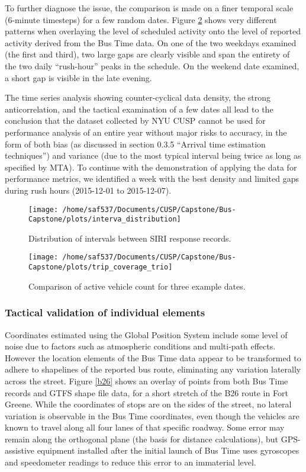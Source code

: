 \documentclass[12pt]{report}
\begin{document}
To further diagnose the issue, the comparison is made on a finer temporal scale (6-minute timesteps) for a few random dates.  Figure \ref{trio} shows very different patterns when overlaying the level of scheduled activity onto the level of reported activity derived from the Bus Time data.  On one of the two weekdays examined  (the first and third), two large gaps are clearly visible and span the entirety of the two daily “rush-hour” peaks in the schedule.  On the weekend date examined, a short gap is visible in the late evening.

The time series analysis showing counter-cyclical data density, the strong anticorrelation, and the tactical examination of a few dates all lead to the conclusion that the dataset collected by NYU CUSP cannot be used for performance analysis of an entire year without major risks to accuracy, in the form of both bias (as discussed in section 0.3.5 “Arrival time estimation techniques”) and variance (due to the most typical interval being twice as long as specified by MTA).  To continue with the demonstration of applying the data for performance metrics, we identified a week with the best density and limited gaps during rush hours (2015-12-01 to 2015-12-07).     
        
\begin{figure}[!ht]
\label{week_day}
  \caption{Distribution of intervals between SIRI response records.}
  \centering
    \texttt{[image: /home/saf537/Documents/CUSP/Capstone/Bus-Capstone/plots/interva\_distribution]}
\end{figure}

\begin{figure}[!ht]
\label{trio}
  \caption{Comparison of active vehicle count for three example dates.}
  \centering
    \texttt{[image: /home/saf537/Documents/CUSP/Capstone/Bus-Capstone/plots/trip\_coverage\_trio]}
\end{figure}


\subsubsection*{Tactical validation of individual elements}


Coordinates estimated using the Global Position System include some level of noise due to factors such as atmospheric conditions and multi-path effects. However the location elements of the Bus Time data appear to be transformed to adhere to shapelines of the reported bus route, eliminating any variation laterally across the street. Figure \ref{b26} shows an overlay of points from both Bus Time records and GTFS shape file data, for a short stretch of the B26 route in Fort Greene.  While the coordinates of stops are on the sides of the street, no lateral variation is observable in the Bus Time coordinates, even though the vehicles are known to travel along all four lanes of that specific roadway. Some error may remain along the orthogonal plane (the basis for distance calculations), but GPS-assistive equipment installed after the initial launch of Bus Time uses gyroscopes and speedometer readings to reduce this error to an immaterial level.
\end{document}
